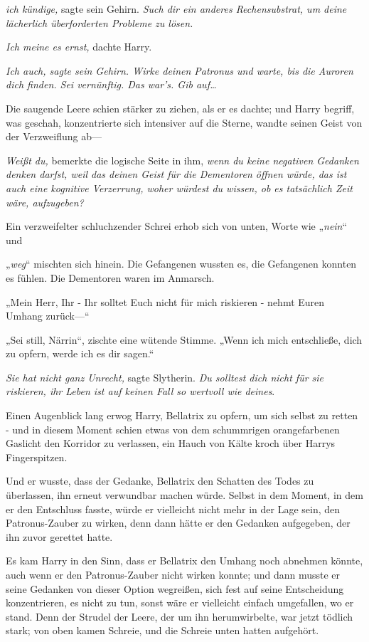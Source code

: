 {\emph{ich kündige,} sagte sein Gehirn. \emph{Such dir ein anderes Rechensubstrat, um deine lächerlich überforderten Probleme zu lösen.}

\emph{Ich meine es ernst,} dachte Harry.

\emph{Ich auch, sagte sein Gehirn. Wirke deinen Patronus und warte, bis die Auroren dich finden. Sei vernünftig. Das war's. Gib auf…}

Die saugende Leere schien stärker zu ziehen, als er es dachte; und Harry begriff, was geschah, konzentrierte sich intensiver auf die Sterne, wandte seinen Geist von der Verzweiflung ab—

\emph{Weißt du,} bemerkte die logische Seite in ihm, \emph{wenn du keine negativen Gedanken denken darfst, weil das deinen Geist für die Dementoren öffnen würde, das ist auch eine kognitive Verzerrung, woher würdest du wissen, ob es tatsächlich Zeit wäre, aufzugeben?}

Ein verzweifelter schluchzender Schrei erhob sich von unten, Worte wie „\emph{nein}“ und

„\emph{weg}“ mischten sich hinein. Die Gefangenen wussten es, die Gefangenen konnten es fühlen. Die Dementoren waren im Anmarsch.

„Mein Herr, Ihr - Ihr solltet Euch nicht für mich riskieren - nehmt Euren Umhang zurück—“

„Sei still, Närrin“, zischte eine wütende Stimme. „Wenn ich mich entschließe, dich zu opfern, werde ich es dir sagen.“

\emph{Sie hat nicht ganz Unrecht,} sagte Slytherin. \emph{Du solltest dich nicht für sie riskieren, ihr Leben ist auf keinen Fall so wertvoll wie deines}.

Einen Augenblick lang erwog Harry, Bellatrix zu opfern, um sich selbst zu retten - und in diesem Moment schien etwas von dem schummrigen orangefarbenen Gaslicht den Korridor zu verlassen, ein Hauch von Kälte kroch über Harrys Fingerspitzen.

Und er wusste, dass der Gedanke, Bellatrix den Schatten des Todes zu überlassen, ihn erneut verwundbar machen würde. Selbst in dem Moment, in dem er den Entschluss fasste, würde er vielleicht nicht mehr in der Lage sein, den Patronus-Zauber zu wirken, denn dann hätte er den Gedanken aufgegeben, der ihn zuvor gerettet hatte.

Es kam Harry in den Sinn, dass er Bellatrix den Umhang noch abnehmen könnte, auch wenn er den Patronus-Zauber nicht wirken konnte; und dann musste er seine Gedanken von dieser Option wegreißen, sich fest auf seine Entscheidung konzentrieren, es nicht zu tun, sonst wäre er vielleicht einfach umgefallen, wo er stand. Denn der Strudel der Leere, der um ihn herumwirbelte, war jetzt tödlich stark; von oben kamen Schreie, und die Schreie unten hatten aufgehört.

}
